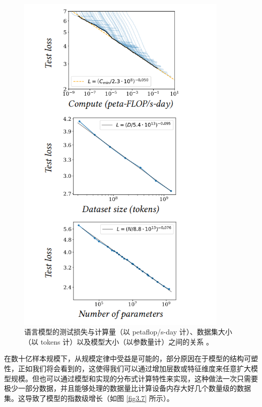 \begin{figure}
    \centering
    \includegraphics[width=0.9\textwidth]{fig/fig3.6.png}
    \caption[缩放定律]{语言模型的测试损失与计算量（以 petaflop/s-day 计）、数据集大小（以 tokens 计）以及模型大小（以参数量计）之间的关系 \citep{arxiv-2001.08361}。}
    \label{fig3.6}
\end{figure}

在数十亿样本规模下，从规模定律中受益是可能的，部分原因在于模型的结构可塑性，正如我们将会看到的，这使得我们可以通过增加层数或特征维度来任意扩大模型规模。但也可以通过模型和实现的分布式计算特性来实现，这种做法一次只需要极少一部分数据，并且能够处理的数据量比计算设备内存大好几个数量级的数据集。这导致了模型的指数级增长（如图 \ref{fig3.7} 所示）。

